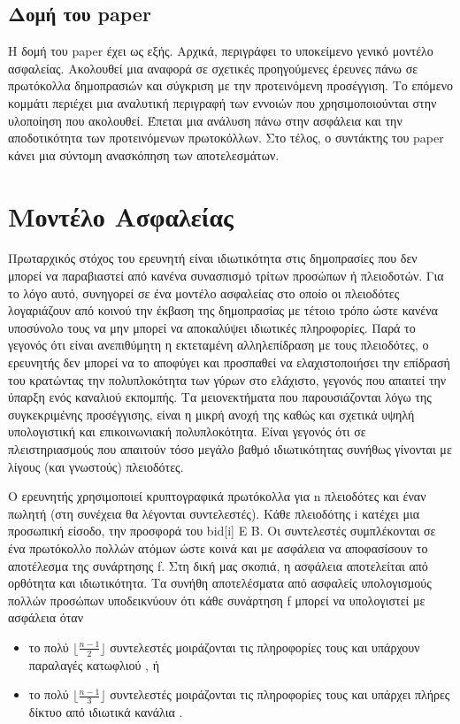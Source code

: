 \documentclass[letterpaper,11pt]{article}
\begin{document}
\subsection{Δομή του paper}

Η δομή του paper έχει ως εξής. Αρχικά, περιγράφει το υποκείμενο γενικό μοντέλο ασφαλείας. Ακολουθεί μια αναφορά
σε σχετικές προηγούμενες έρευνες πάνω σε πρωτόκολλα δημοπρασιών και σύγκριση με την προτεινόμενη προσέγγιση. Το
επόμενο κομμάτι περιέχει μια αναλυτική περιγραφή των εννοιών που χρησιμοποιούνται στην υλοποίηση που ακολουθεί.
Έπεται μια ανάλυση πάνω στην ασφάλεια και την αποδοτικότητα των προτεινόμενων πρωτοκόλλων. Στο τέλος, ο
συντάκτης του paper κάνει μια σύντομη ανασκόπηση των αποτελεσμάτων.

\section{Μοντέλο Ασφαλείας}

Πρωταρχικός στόχος του ερευνητή είναι ιδιωτικότητα στις δημοπρασίες που δεν μπορεί να παραβιαστεί από κανένα
συνασπισμό τρίτων προσώπων ή πλειοδοτών. Για το λόγο αυτό, συνηγορεί σε ένα μοντέλο ασφαλείας στο οποίο οι
πλειοδότες λογαριάζουν από κοινού την έκβαση της δημοπρασίας με τέτοιο τρόπο ώστε κανένα υποσύνολο τους να μην
μπορεί να αποκαλύψει ιδιωτικές πληροφορίες. Παρά το γεγονός ότι είναι ανεπιθύμητη η εκτεταμένη αλληλεπίδραση με
τους πλειοδότες, ο ερευνητής δεν μπορεί να το αποφύγει και προσπαθεί να ελαχιστοποιήσει την επίδρασή του
κρατώντας την πολυπλοκότητα των γύρων στο ελάχιστο, γεγονός που απαιτεί την ύπαρξη ενός καναλιού εκπομπής. Τα
μειονεκτήματα που παρουσιάζονται λόγω της συγκεκριμένης προσέγγισης, είναι η μικρή ανοχή της καθώς και σχετικά
υψηλή υπολογιστική και επικοινωνιακή πολυπλοκότητα. Είναι γεγονός ότι σε πλειστηριασμούς που απαιτούν τόσο
μεγάλο βαθμό ιδιωτικότητας συνήθως γίνονται με λίγους (και γνωστούς) πλειοδότες.

Ο ερευνητής χρησιμοποιεί κρυπτογραφικά πρωτόκολλα για n πλειοδότες και έναν πωλητή (στη συνέχεια θα λέγονται
συντελεστές). Κάθε πλειοδότης i κατέχει μια προσωπική είσοδο, την προσφορά του bid[i] E B. Οι συντελεστές
συμπλέκονται σε ένα πρωτόκολλο πολλών ατόμων ώστε κοινά και με ασφάλεια να αποφασίσουν το αποτέλεσμα της
συνάρτησης f. Στη δική μας σκοπιά, η ασφάλεια αποτελείται από ορθότητα και ιδιωτικότητα. Τα συνήθη
αποτελέσματα από ασφαλείς υπολογισμούς πολλών προσώπων υποδεικνύουν ότι κάθε συνάρτηση f μπορεί να υπολογιστεί
με ασφάλεια όταν
\begin{itemize}
	\item το πολύ $\lfloor \frac{n-1}{2} \rfloor$ συντελεστές μοιράζονται τις πληροφορίες τους και υπάρχουν παραλαγές κατωφλιού \cite{GMW}, ή 
	\item το πολύ $\lfloor \frac{n-1}{3} \rfloor$ συντελεστές μοιράζονται τις πληροφορίες τους και υπάρχει πλήρες δίκτυο από
ιδιωτικά κανάλια \cite{OGW,CCD}.
\end{itemize}
\end{document}
